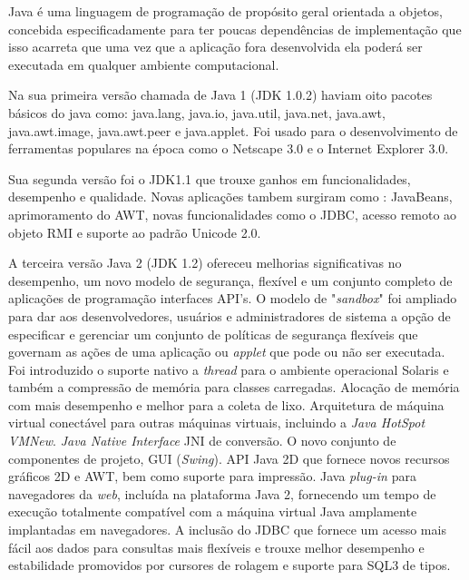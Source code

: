 Java é uma linguagem de programação de propósito geral orientada a objetos, concebida especificadamente para ter poucas dependências de implementação que isso acarreta que uma vez que a aplicação fora desenvolvida ela poderá ser executada em qualquer ambiente computacional.

Na sua primeira versão chamada de Java 1 (\acs{JDK} 1.0.2) haviam oito pacotes básicos do java como: java.lang, java.io, java.util, java.net, java.awt, java.awt.image, java.awt.peer e java.applet. Foi usado para o desenvolvimento de ferramentas populares na época como o Netscape 3.0 e o Internet Explorer 3.0.

Sua segunda versão foi o \acs{JDK}1.1 \cite{JDK1.1} que trouxe ganhos em funcionalidades, desempenho e qualidade. Novas aplicações tambem surgiram como : JavaBeans, aprimoramento do \acs{AWT}, novas funcionalidades como o \acs{JDBC}, acesso remoto ao objeto \acs{RMI} e suporte ao padrão Unicode 2.0.

A terceira versão Java 2 (\acs{JDK} 1.2) ofereceu melhorias significativas no desempenho, um novo modelo de segurança, flexível e um conjunto completo de aplicações de programação interfaces \acs{API}'s. O modelo de "\textit{sandbox}" foi ampliado para dar aos desenvolvedores, usuários e administradores de sistema a opção de especificar e gerenciar um conjunto de políticas de segurança flexíveis que governam as ações de uma aplicação ou \textit{applet} que pode ou não ser executada. Foi introduzido o suporte nativo a \textit{thread} para o ambiente operacional Solaris e também a compressão de memória para classes carregadas. Alocação de memória com mais desempenho e melhor para a coleta de lixo. Arquitetura de máquina virtual conectável para outras máquinas virtuais, incluindo a \textit{Java HotSpot VMNew}. \textit{Java Native Interface }\acs{JNI} de conversão. O novo conjunto de componentes de projeto, \acs{GUI} (\textit{Swing}). \acs{API} Java 2D que fornece novos recursos gráficos 2D e \acs{AWT}, bem como suporte para impressão. Java \textit{plug-in} para navegadores da \textit{web}, incluída na plataforma Java 2, fornecendo um tempo de execução totalmente compatível com a máquina virtual Java amplamente implantadas em navegadores. A inclusão do \acs{JDBC} que fornece um acesso mais fácil aos dados para consultas mais flexíveis e trouxe melhor desempenho e estabilidade promovidos por cursores de rolagem e suporte para SQL3 de tipos.


